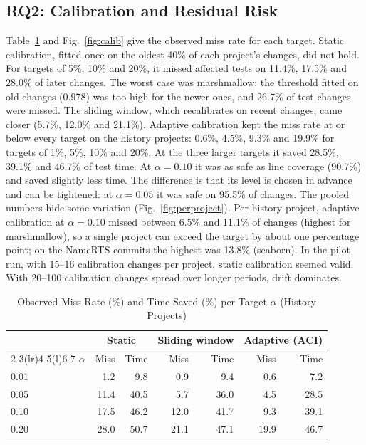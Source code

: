 \documentclass[conference]{IEEEtran}
\begin{document}
\subsection{RQ2: Calibration and Residual Risk}
Table~\ref{tab:rq2} and Fig.~\ref{fig:calib} give the observed miss rate for each target. Static calibration, fitted once on the oldest 40\% of each project's changes, did not hold. For targets of 5\%, 10\% and 20\%, it missed affected tests on 11.4\%, 17.5\% and 28.0\% of later changes. The worst case was marshmallow: the threshold fitted on old changes (0.978) was too high for the newer ones, and 26.7\% of test changes were missed. The sliding window, which recalibrates on recent changes, came closer (5.7\%, 12.0\% and 21.1\%). Adaptive calibration kept the miss rate at or below every target on the history projects: 0.6\%, 4.5\%, 9.3\% and 19.9\% for targets of 1\%, 5\%, 10\% and 20\%. At the three larger targets it saved 28.5\%, 39.1\% and 46.7\% of test time. At $\alpha=0.10$ it was as safe as line coverage (90.7\%) and saved slightly less time. The difference is that its level is chosen in advance and can be tightened: at $\alpha=0.05$ it was safe on 95.5\% of changes. The pooled numbers hide some variation (Fig.~\ref{fig:perproject}). Per history project, adaptive calibration at $\alpha=0.10$ missed between 6.5\% and 11.1\% of changes (highest for marshmallow), so a single project can exceed the target by about one percentage point; on the NameRTS commits the highest was 13.8\% (seaborn). In the pilot run, with 15--16 calibration changes per project, static calibration seemed valid. With 20--100 calibration changes spread over longer periods, drift dominates.

\begin{table}[t]
\caption{Observed Miss Rate (\%) and Time Saved (\%) per Target $\alpha$ (History Projects)}
\label{tab:rq2}
\centering
\footnotesize
\setlength{\tabcolsep}{3pt}
\begin{tabular}{@{}lrrrrrr@{}}
\toprule
& \multicolumn{2}{c}{\textbf{Static}} & \multicolumn{2}{c}{\textbf{Sliding window}} & \multicolumn{2}{c}{\textbf{Adaptive (ACI)}} \\
\cmidrule(lr){2-3}\cmidrule(lr){4-5}\cmidrule(l){6-7}
$\alpha$ & Miss & Time & Miss & Time & Miss & Time \\
\midrule
0.01 & 1.2 & 9.8 & 0.9 & 9.4 & 0.6 & 7.2 \\
0.05 & 11.4 & 40.5 & 5.7 & 36.0 & 4.5 & 28.5 \\
0.10 & 17.5 & 46.2 & 12.0 & 41.7 & 9.3 & 39.1 \\
0.20 & 28.0 & 50.7 & 21.1 & 47.1 & 19.9 & 46.7 \\
\bottomrule
\end{tabular}
\end{table}
\end{document}
